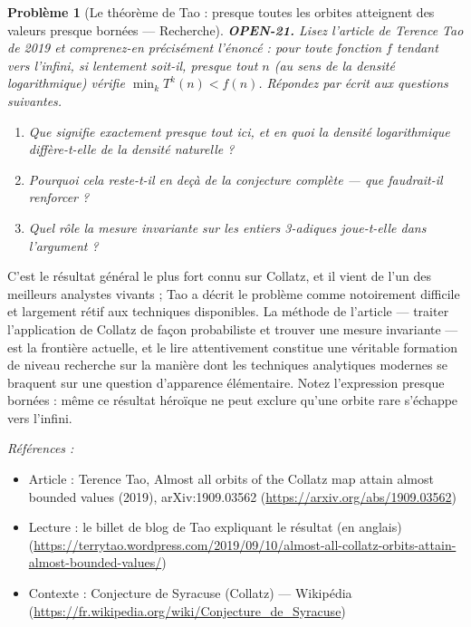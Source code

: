 \documentclass[11pt]{article}
\newtheorem{problem}{Problème}
\newenvironment{refs}{\par\small\noindent\emph{Références :}\begin{itemize}\setlength\itemsep{0pt}}{\end{itemize}\normalsize}
\begin{document}
\begin{problem}[{Le théorème de Tao : presque toutes les orbites atteignent des valeurs presque bornées --- Recherche}]
\textbf{OPEN-21.} Lisez l'article de Terence Tao de 2019 et comprenez-en précisément
l'énoncé : pour toute fonction $ f $ tendant vers l'infini, si lentement soit-il,
presque tout $ n $ (au sens de la densité logarithmique) vérifie
$ \min_k T^{k}(n) < f(n) $. Répondez par écrit aux questions suivantes.
\begin{enumerate}
\item[(a)] Que signifie exactement \og{} presque tout \fg{} ici, et en quoi la densité logarithmique
diffère-t-elle de la densité naturelle ?
\item[(b)] Pourquoi cela reste-t-il en deçà de la conjecture complète --- que faudrait-il
renforcer ?
\item[(c)] Quel rôle la mesure invariante sur les entiers 3-adiques joue-t-elle dans
l'argument ?
\end{enumerate}

\end{problem}

\noindent C'est le résultat général le plus fort connu sur Collatz, et il vient
de l'un des meilleurs analystes vivants ; Tao a décrit le problème comme \og{} notoirement
difficile \fg{} et largement rétif aux techniques disponibles. La méthode de l'article ---
traiter l'application de Collatz de façon probabiliste et trouver une mesure invariante ---
est la frontière actuelle, et le lire attentivement constitue une véritable formation de
niveau recherche sur la manière dont les techniques analytiques modernes se braquent sur
une question d'apparence élémentaire. Notez l'expression \og{} presque bornées \fg{} : même ce
résultat héroïque ne peut exclure qu'une orbite rare s'échappe vers l'infini.

\begin{refs}
\item Article : Terence Tao, \og{} Almost all orbits of the Collatz map attain almost bounded values \fg{} (2019), arXiv:1909.03562 (\url{https://arxiv.org/abs/1909.03562})
\item Lecture : le billet de blog de Tao expliquant le résultat (en anglais) (\url{https://terrytao.wordpress.com/2019/09/10/almost-all-collatz-orbits-attain-almost-bounded-values/})
\item Contexte : Conjecture de Syracuse (Collatz) --- Wikipédia (\url{https://fr.wikipedia.org/wiki/Conjecture_de_Syracuse})
\end{refs}
\end{document}
